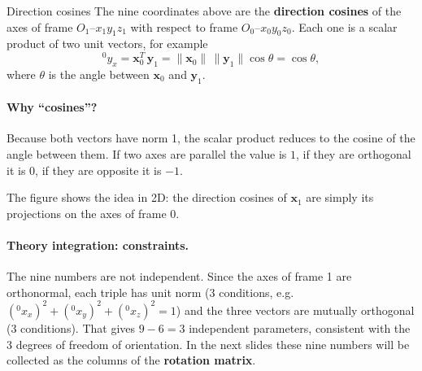 \begin{defbox}{Direction cosines}
The nine coordinates above are the \textbf{direction cosines} of the axes of frame $O_1$--$x_1y_1z_1$ with respect to frame $O_0$--$x_0y_0z_0$. Each one is a scalar product of two unit vectors, for example
\[
{}^0y_x=\mathbf{x}_0^T\,\mathbf{y}_1=\|\mathbf{x}_0\|\,\|\mathbf{y}_1\|\cos\theta=\cos\theta ,
\]
where $\theta$ is the angle between $\mathbf{x}_0$ and $\mathbf{y}_1$.
\end{defbox}

\paragraph{Why ``cosines''?} Because both vectors have norm 1, the scalar product reduces to the cosine of the angle between them. If two axes are parallel the value is $1$, if they are orthogonal it is $0$, if they are opposite it is $-1$.

\begin{center}
\end{center}

The figure shows the idea in 2D: the direction cosines of $\mathbf{x}_1$ are simply its projections on the axes of frame 0.

\paragraph{Theory integration: constraints.} The nine numbers are not independent. Since the axes of frame 1 are orthonormal, each triple has unit norm (3 conditions, e.g.\ $({}^0x_x)^2+({}^0x_y)^2+({}^0x_z)^2=1$) and the three vectors are mutually orthogonal (3 conditions). That gives $9-6=3$ independent parameters, consistent with the 3 degrees of freedom of orientation. In the next slides these nine numbers will be collected as the columns of the \textbf{rotation matrix}.

